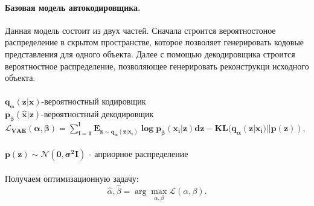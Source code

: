 \paragraph{Базовая модель автокодировщика.} Данная модель состоит из двух частей. Сначала строится вероятностоное распределение в скрытом пространстве, которое позволяет генерировать кодовые представления для одного объекта. Далее с помощью декодировщика строится вероятностное распределение, позволяющее генерировать реконструкци исходного объекта.\\
\\
$\mathbf{q_{\alpha}(z|x)}$-вероятностный кодировщик\\
$\mathbf{p_{\beta}(\hat{x}|z)}$-вероятностный декодировщик\\
$\mathbf{\mathcal{L}_{\text{VAE}}(\alpha, \beta)=\sum\limits_{i=1}^{l}\text{E}_{z\sim q_{\alpha}(z|x_{i})}\log{p_{\beta}(x_{i}|z)}dz-\text{KL}(q_{\alpha}(z|x_{i})||p(z))}$,\\
\\
$\mathbf{p(z)\sim \mathcal{N}(0,\sigma^{2}\mathbf{I})}$ - априорное распределение\\
\\
Получаем оптимизационную задачу:
$$\hat{\alpha}, \hat{\beta} = \arg\max_{\alpha, \beta} \mathcal{L}(\alpha, \beta).$$

\newpage
